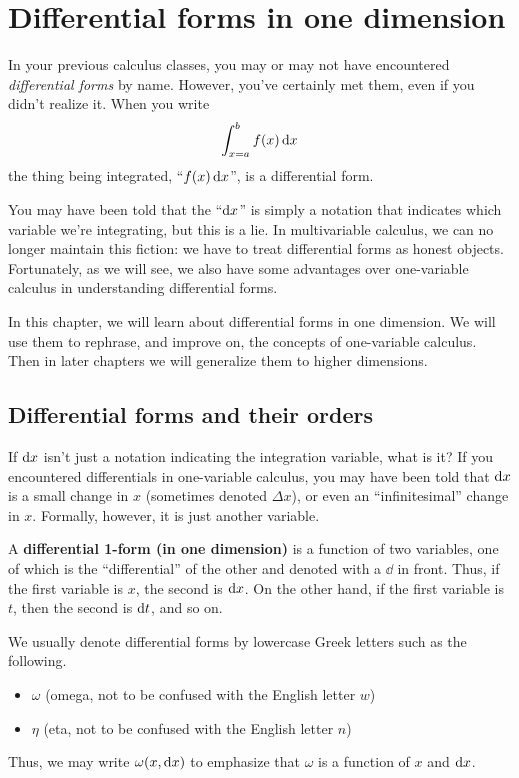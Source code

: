 \ifdefined\inmaster\else\def\subonly{\jobname}\fi

\chapter{Differential forms in one dimension}
\label{cha:1dforms}

In your previous calculus classes, you may or may not have encountered \emph{differential forms} by name.
However, you've certainly met them, even if you didn't realize it.
When you write
\[ \int_{x=a}^b f(x) \,{\mathrm{d} x} \]
the thing being integrated, ``$f(x) \,{\mathrm{d} x}$'', is a differential form.

You may have been told that the ``${\mathrm{d} x}$'' is simply a notation that indicates which variable we're integrating, but this is a lie.
In multivariable calculus, we can no longer maintain this fiction: we have to treat differential forms as honest objects.
Fortunately, as we will see, we also have some advantages over one-variable calculus in understanding differential forms.

In this chapter, we will learn about differential forms in one dimension.
We will use them to rephrase, and improve on, the concepts of one-variable calculus.
Then in later chapters we will generalize them to higher dimensions.

\section{Differential forms and their orders}
\label{sec:1d-differential-forms}

If ${\mathrm{d} x}$ isn't just a notation indicating the integration variable, what is it?
If you encountered differentials in one-variable calculus, you may have been told that ${\mathrm{d} x}$ is a small change in $x$ (sometimes denoted $\Delta x$), or even an ``infinitesimal'' change in $x$.
Formally, however, it is just another variable.

\begin{defn}
  A \textbf{differential 1-form (in one dimension)} is a function of two variables, one of which is the ``differential'' of the other and denoted with a $\dd$ in front.
  Thus, if the first variable is $x$, the second is ${\mathrm{d} x}$.
  On the other hand, if the first variable is $t$, then the second is ${\mathrm{d} t}$, and so on.
\end{defn}

We usually denote differential forms by lowercase Greek letters such as the following.
\begin{itemize}
\item $\omega$ (omega, not to be confused with the English letter $w$)
\item $\eta$ (eta, not to be confused with the English letter $n$)
\end{itemize}
Thus, we may write $\omega(x,{\mathrm{d} x})$ to emphasize that $\omega$ is a function of $x$ and ${\mathrm{d} x}$.

